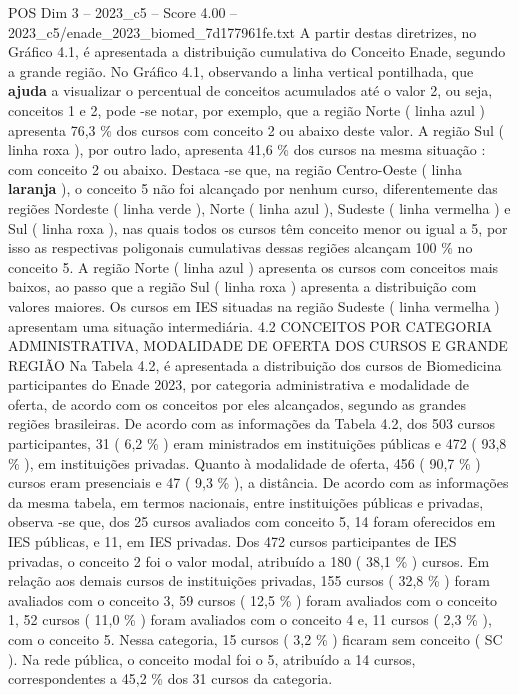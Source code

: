 \begin{textsample}{POS Dim 3 – 2023\_c5 – Score 4.00 – 2023\_c5/enade\_2023\_biomed\_7d177961fe.txt}
A partir destas diretrizes, no Gráfico 4.1, é apresentada a distribuição cumulativa do Conceito Enade, segundo a grande região.
No Gráfico 4.1, observando a linha vertical pontilhada, que \textbf{ajuda} a visualizar o percentual de conceitos acumulados até o valor 2, ou seja, conceitos 1 e 2, pode -se notar, por exemplo, que a região Norte ( linha azul ) apresenta 76,3 \% dos cursos com conceito 2 ou abaixo deste valor.
A região Sul ( linha roxa ), por outro lado, apresenta 41,6 \% dos cursos na mesma situação : com conceito 2 ou abaixo.
Destaca -se que, na região Centro-Oeste ( linha \textbf{laranja} ), o conceito 5 não foi alcançado por nenhum curso, diferentemente das regiões Nordeste ( linha verde ), Norte ( linha azul ), Sudeste ( linha vermelha ) e Sul ( linha roxa ), nas quais todos os cursos têm conceito menor ou igual a 5, por isso as respectivas poligonais cumulativas dessas regiões alcançam 100 \% no conceito 5.
A região Norte ( linha azul ) apresenta os cursos com conceitos mais baixos, ao passo que a região Sul ( linha roxa ) apresenta a distribuição com valores maiores.
Os cursos em IES situadas na região Sudeste ( linha vermelha ) apresentam uma situação intermediária. 4.2 CONCEITOS POR CATEGORIA ADMINISTRATIVA, MODALIDADE DE OFERTA DOS CURSOS E GRANDE REGIÃO Na Tabela 4.2, é apresentada a distribuição dos cursos de Biomedicina participantes do Enade 2023, por categoria administrativa e modalidade de oferta, de acordo com os conceitos por eles alcançados, segundo as grandes regiões brasileiras.
De acordo com as informações da Tabela 4.2, dos 503 cursos participantes, 31 ( 6,2 \% ) eram ministrados em instituições públicas e 472 ( 93,8 \% ), em instituições privadas.
Quanto à modalidade de oferta, 456 ( 90,7 \% ) cursos eram presenciais e 47 ( 9,3 \% ), a distância.
De acordo com as informações da mesma tabela, em termos nacionais, entre instituições públicas e privadas, observa -se que, dos 25 cursos avaliados com conceito 5, 14 foram oferecidos em IES públicas, e 11, em IES privadas.
Dos 472 cursos participantes de IES privadas, o conceito 2 foi o valor modal, atribuído a 180 ( 38,1 \% ) cursos.
Em relação aos demais cursos de instituições privadas, 155 cursos ( 32,8 \% ) foram avaliados com o conceito 3, 59 cursos ( 12,5 \% ) foram avaliados com o conceito 1, 52 cursos ( 11,0 \% ) foram avaliados com o conceito 4 e, 11 cursos ( 2,3 \% ), com o conceito 5.
Nessa categoria, 15 cursos ( 3,2 \% ) ficaram sem conceito ( SC ).
Na rede pública, o conceito modal foi o 5, atribuído a 14 cursos, correspondentes a 45,2 \% dos 31 cursos da categoria.

\end{textsample}

